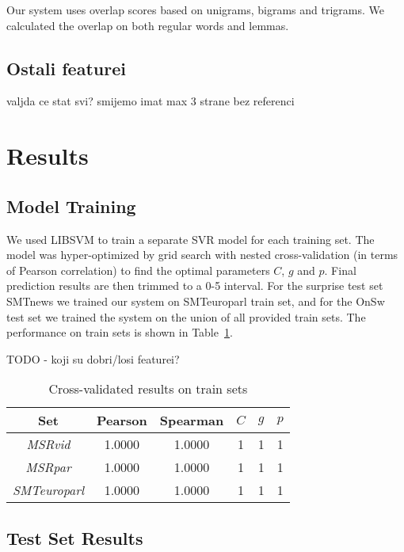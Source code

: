 \documentclass[10pt, a4paper]{article}
\begin{document}
Our system uses overlap scores based on unigrams, bigrams and trigrams. We calculated the overlap on both regular words and lemmas.

\subsection{Ostali featurei}

valjda ce stat svi? smijemo imat max 3 strane bez referenci

\section{Results}

\subsection{Model Training}

We used LIBSVM to train a separate SVR model for each training set. The model was hyper-optimized by grid search with nested cross-validation (in terms of Pearson correlation) to find the optimal parameters $C$, $g$ and $p$. Final prediction results are then trimmed to a 0-5 interval. For the surprise test set SMTnews we trained our system on SMTeuroparl train set, and for the OnSw test set we trained the system on the union of all provided train sets. The performance on train sets is shown in Table~\ref{tab:train-results-table}.

TODO - koji su dobri/losi featurei?

\begin{table}[h]
\caption{Cross-validated results on train sets}
\label{tab:train-results-table}
\begin{center}
\begin{tabular}{cccccc}
\toprule
Set & Pearson & Spearman & $C$ & $g$ & $p$ \\
\midrule
\textit{MSRvid} & 1.0000 & 1.0000 & 1 & 1 & 1 \\
\textit{MSRpar} & 1.0000 & 1.0000 & 1 & 1 & 1 \\
\textit{SMTeuroparl} & 1.0000 & 1.0000 & 1 & 1 & 1 \\
\bottomrule
\end{tabular}
\end{center}
\end{table}

\subsection{Test Set Results}
\end{document}
